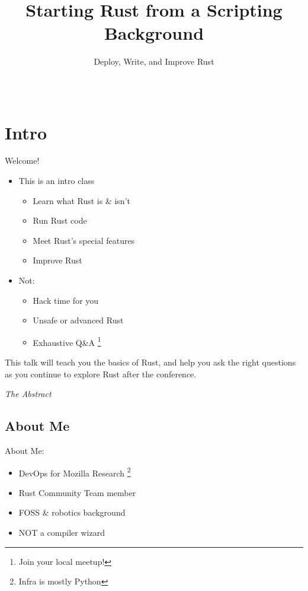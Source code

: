\documentclass[aspectratio=169]{beamer}
\title[Rust 101]{Starting Rust from a Scripting Background}
\subtitle{Deploy, Write, and Improve Rust}
\author{\name}
\date{\talkdate\\ \slidesurl}
\begin{document}
\begin{frame}
\titlepage
\end{frame}

\section{Intro}

\begin{frame}
    Welcome!
     \begin{itemize}
        \item This is an intro class
        \begin{itemize}
            \item Learn what Rust is \& isn't
            \item Run Rust code
            \item Meet Rust's special features
            \item Improve Rust
        \end{itemize}
        \item Not:
        \begin{itemize}
            \item Hack time for you
            \item Unsafe or advanced Rust
            \item Exhaustive Q\&A \footnote{Join your local meetup!}
        \end{itemize}
    \end{itemize}
\end{frame}

\begin{frame}

\epigraph{This talk will teach you the basics of Rust, and help you ask the
right questions as you continue to explore Rust after the
conference.}{\textit{The Abstract}}

\end{frame}

\subsection{About Me}

\begin{frame}
    About Me:
    \begin{itemize}
        \item DevOps for Mozilla Research \footnote{Infra is mostly Python}
        \item Rust Community Team member
        \item FOSS \& robotics background
        \item NOT a compiler wizard
    \end{itemize}
\end{frame}
\end{document}
